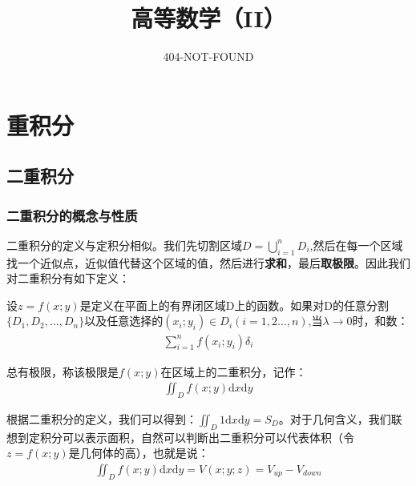 \documentclass{ctexart}
\title{高等数学（II）}
\author{404-NOT-FOUND}
\let\oldtextbf\textbf
\renewcommand{\textbf}[1]{\textcolor{brown!50!red}{\oldtextbf{#1}}}
\begin{document}
\maketitle
\tableofcontents
\clearpage
\section{重积分}
\subsection{二重积分}
\subsubsection{二重积分的概念与性质}
二重积分的定义与定积分相似。我们先切割区域$D=\bigcup_{i=1}^{n}D_i $,然后在每一个区域找一个近似点，近似值代替这个区域的值，然后进行\textbf{\color{brown!50!red}求和}，最后\textbf{\color{brown!50!red}取极限}。因此我们对二重积分有如下定义：

\begin{tcolorbox}[
    colback=bac2,     %
    colframe=fra2,   %
    coltitle=white,             %
    coltext=tex2,
    title=二重积分的定义,
    fonttitle=\bfseries,        %
arc=3mm,                     %
breakable
]
设$z=f(x;y)$是定义在平面上的有界闭区域D上的函数。如果对D的任意分割$\{D_1,D_2,...,D_n\}$以及任意选择的$(x_i;y_i)\in D_i(i=1,2...,n)$,当$\lambda\to 0$时，和数：
\begin{align*}
    \sum_{i=1}^n f(x_i;y_i)\delta_i
\end{align*}

总有极限，称该极限是$f(x;y)$在区域上的二重积分，记作：
\begin{align*}
    \iint_D f(x;y)\mathrm{d}x\mathrm{d}y\tag{1-1}
\end{align*}

\end{tcolorbox}
根据二重积分的定义，我们可以得到：$\iint_D 1\mathrm{d}x\mathrm{d}y=S_D$。对于几何含义，我们联想到定积分可以表示面积，自然可以判断出二重积分可以代表体积（令$z=f(x;y)$是几何体的高），也就是说：
\begin{align*}
    \iint_D f(x;y)\mathrm{d}x\mathrm{d}y=V(x;y;z)=V_{up}-V_{down}
\end{align*}
\end{document}
